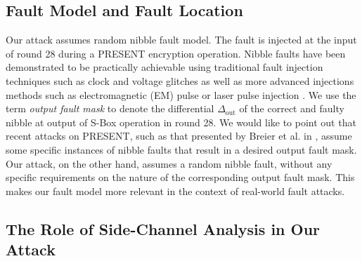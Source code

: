 \documentclass[10pt, conference, compsocconf]{IEEEtran}  %
\numberwithin{Definition}{section}
\numberwithin{Claim}{section}
\begin{document}
\subsection{Fault Model and Fault Location}

Our attack assumes random nibble fault model. The fault is injected at the input of round 28 during a PRESENT encryption operation. Nibble faults have been demonstrated to be practically achievable using traditional fault injection techniques such as clock and voltage glitches \cite{Agoyan:0,Barenghi2} as well as more advanced injections methods such as electromagnetic (EM) pulse or laser pulse injection \cite{Dehbaoui,Trichina}. We use the term \emph{output fault mask} to denote the differential $\Delta_{\text{out}}$ of the correct and faulty nibble at output of S-Box operation in round 28. We would like to point out that recent attacks on PRESENT, such as that presented by Breier et al. in \cite{siot2015}, assume some specific instances of nibble faults that result in a desired output fault mask. Our attack, on the other hand, assumes a random nibble fault, without any specific requirements on the nature of the corresponding output fault mask. This makes our fault model more relevant in the context of real-world fault attacks.

\subsection{The Role of Side-Channel Analysis in Our Attack}
\label{subsec:SCA}
\end{document}
